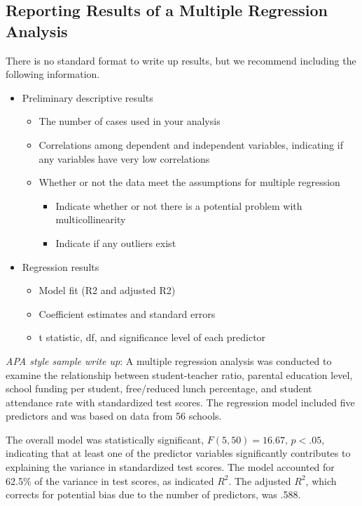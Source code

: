 \documentclass[
  letterpaper,
  DIV=11,
  numbers=noendperiod]{scrreprt}
\begin{document}
\subsection{Reporting Results of a Multiple Regression
Analysis\,}\label{reporting-results-of-a-multiple-regression-analysis}

There is no standard format to write up results, but we recommend
including the following information.

\begin{itemize}
\item
  Preliminary descriptive results\,

  \begin{itemize}
  \item
    The number of cases used in your analysis\,
  \item
    Correlations among dependent and independent variables, indicating
    if any variables have very low correlations\,
  \item
    Whether or not the data meet the assumptions for multiple
    regression\,

    \begin{itemize}
    \item
      Indicate whether or not there is a potential problem with
      multicollinearity\,
    \item
      Indicate if any outliers exist\,
    \end{itemize}
  \end{itemize}
\item
  Regression results\,

  \begin{itemize}
  \item
    Model fit (R2 and adjusted R2)\,
  \item
    Coefficient estimates and standard errors\,
  \item
    t statistic, df, and significance level of each predictor\,
  \end{itemize}
\end{itemize}

\emph{APA style sample write up}: A multiple regression analysis was
conducted to examine the relationship between student-teacher ratio,
parental education level, school funding per student, free/reduced lunch
percentage, and student attendance rate with standardized test scores.
The regression model included five predictors and was based on data from
56 schools.

The overall model was statistically significant,
\(F(5, 50) = 16.67, \, p < .05\), indicating that at least one of the
predictor variables significantly contributes to explaining the variance
in standardized test scores. The model accounted for 62.5\% of the
variance in test scores, as indicated \(R^2\). The adjusted \(R^2\),
which corrects for potential bias due to the number of predictors, was
\hspace{0pt}.588.
\end{document}
